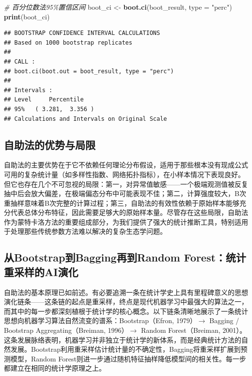 \documentclass[
  twoside,12pt,fontset=none]{ctexbook}
\newenvironment{Shaded}{\begin{snugshade}}{\end{snugshade}}
\newcommand{\AttributeTok}[1]{\textcolor[rgb]{0.13,0.29,0.53}{#1}}
\newcommand{\CommentTok}[1]{\textcolor[rgb]{0.56,0.35,0.01}{\textit{#1}}}
\newcommand{\FunctionTok}[1]{\textcolor[rgb]{0.13,0.29,0.53}{\textbf{#1}}}
\newcommand{\NormalTok}[1]{#1}
\newcommand{\OtherTok}[1]{\textcolor[rgb]{0.56,0.35,0.01}{#1}}
\newcommand{\StringTok}[1]{\textcolor[rgb]{0.31,0.60,0.02}{#1}}
\begin{document}
\begin{Shaded}
\begin{Highlighting}[]
\CommentTok{\# 百分位数法95\%置信区间}
\NormalTok{boot\_ci }\OtherTok{\textless{}{-}} \FunctionTok{boot.ci}\NormalTok{(boot\_result, }\AttributeTok{type =} \StringTok{"perc"}\NormalTok{)}
\FunctionTok{print}\NormalTok{(boot\_ci)}
\end{Highlighting}
\end{Shaded}

\begin{verbatim}
## BOOTSTRAP CONFIDENCE INTERVAL CALCULATIONS
## Based on 1000 bootstrap replicates
## 
## CALL : 
## boot.ci(boot.out = boot_result, type = "perc")
## 
## Intervals : 
## Level     Percentile     
## 95%   ( 3.281,  3.356 )  
## Calculations and Intervals on Original Scale
\end{verbatim}

\hypertarget{ux81eaux52a9ux6cd5ux7684ux4f18ux52bfux4e0eux5c40ux9650}{%
\subsection{自助法的优势与局限}\label{ux81eaux52a9ux6cd5ux7684ux4f18ux52bfux4e0eux5c40ux9650}}

自助法的主要优势在于它不依赖任何理论分布假设，适用于那些根本没有现成公式可用的复杂统计量（如多样性指数、网络拓扑指标），在小样本情况下表现良好。但它也存在几个不可忽视的局限：第一，对异常值敏感------一个极端观测值被反复抽中后会放大偏差，在极端偏态分布中可能表现不佳；第二，计算强度较大，B次重抽样意味着B次完整的计算过程；第三，自助法的有效性依赖于原始样本能够充分代表总体分布特征，因此需要足够大的原始样本量。尽管存在这些局限，自助法作为蒙特卡洛方法的重要组成部分，为我们提供了强大的统计推断工具，特别适用于处理那些传统参数方法难以解决的复杂生态学问题。

\hypertarget{ch07-bootstrap-to-rf}{%
\subsection{从Bootstrap到Bagging再到Random Forest：统计重采样的AI演化}\label{ch07-bootstrap-to-rf}}

自助法的基本原理已如前述。有必要追溯一条在统计学史上具有里程碑意义的思想演化链条------这条链的起点是重采样，终点是现代机器学习中最强大的算法之一，而其中的每一步都深刻植根于统计学的核心概念。以下链条清晰地展示了一条统计思想向机器学习算法自然流变的谱系：Bootstrap（Efron, 1979）\(\to\) Bagging / Bootstrap Aggregating（Breiman, 1996）\(\to\) Random Forest（Breiman, 2001）。这条发展脉络表明，机器学习并非独立于统计学的新体系，而是经典统计方法的自然发展。Bootstrap利用重采样估计统计量的不确定性，Bagging将重采样扩展到预测模型，Random Forest则进一步通过随机特征抽样降低模型间的相关性。每一步都建立在相同的统计学原理之上。
\end{document}
